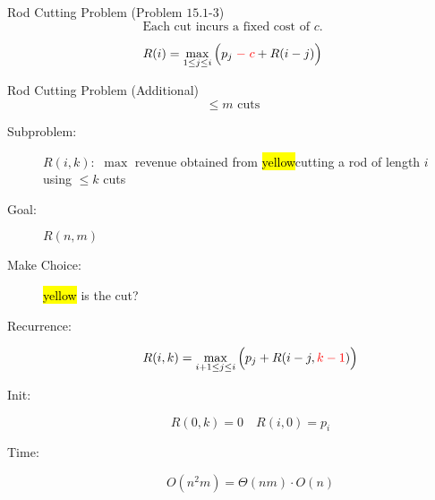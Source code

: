 \begin{frame}{}
  \begin{exampleblock}{Rod Cutting Problem (Problem $15.1$-$3$)}
    \[
      \text{Each cut incurs a fixed cost of } c.
    \]
  \end{exampleblock}

  \pause
  \[
    R(i) = \max_{1 \le j \le i} \Big(p_j \;\textcolor{red}{ -\; c} + R(i-j)\Big)
  \]
\end{frame}

\begin{frame}{}
  \begin{exampleblock}{Rod Cutting Problem (Additional)}
    \[
      \le m \text{ cuts}
    \]
  \end{exampleblock}

  \pause
  \begin{description}
    \item[Subproblem:] $R(i,k):$ $\max$ revenue obtained from \hl{yellow}{cutting a rod of length $i$ using $\le k$ cuts}
    \item[Goal:] $R(n, m)$
      \pause
      \vspace{0.30cm}
    \item[Make Choice:] \hl{yellow}{ is the {\it {}} cut?}
      \pause
    \item[Recurrence:] 
      \[
	R(i,k) = \max_{i+1 \le j \le i} \Big(p_j + R(i-j, \textcolor{red}{k-1})\Big)
      \]
      \pause
    \item[Init:]
      \[
	R(0, k) = 0	\quad R(i, 0) = p_i
      \]
      \pause
    \item[Time:] 
      \[
	O(n^2 m) = \Theta(nm) \cdot O(n)
      \]
  \end{description}
\end{frame}

% 
% 
